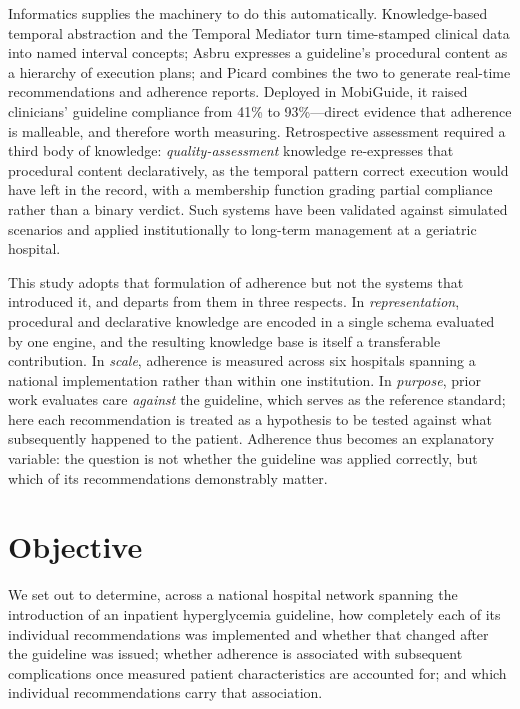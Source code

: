Informatics supplies the machinery to do this automatically. Knowledge-based
temporal abstraction and the Temporal Mediator \citep{shahar1997framework} turn
time-stamped clinical data into named interval concepts; Asbru
\citep{shahar1997asbru, shahar1998asgaard} expresses a guideline's procedural
content as a hierarchy of execution plans; and Picard
\citep{shalom2016architecture} combines the two to generate real-time
recommendations and adherence reports. Deployed in MobiGuide,\citep{peleg2022mobiguide} it raised clinicians' guideline compliance from
41\% to 93\%---direct evidence that adherence is malleable, and therefore worth
measuring. Retrospective assessment required a third body of knowledge:
\emph{quality-assessment} knowledge \citep{ben2024supporting} re-expresses that
procedural content declaratively, as the temporal pattern correct execution
would have left in the record, with a membership function grading partial
compliance rather than a binary verdict. Such systems have been validated
against simulated scenarios \citep{shalom2015multiple} and applied
institutionally to long-term management at a geriatric hospital.\citep{shalom2024implementation}

This study adopts that formulation of adherence but not the systems that
introduced it, and departs from them in three respects. In
\emph{representation}, procedural and declarative knowledge are encoded in a
single schema evaluated by one engine, and the resulting knowledge base is
itself a transferable contribution. In \emph{scale}, adherence is measured
across six hospitals spanning a national implementation rather than within one
institution. In \emph{purpose}, prior work evaluates care \emph{against} the
guideline, which serves as the reference standard; here each recommendation is
treated as a hypothesis to be tested against what subsequently happened to the
patient. Adherence thus becomes an explanatory variable: the question is not
whether the guideline was applied correctly, but which of its recommendations
demonstrably matter.

\section{Objective}
\label{sec:objective}

We set out to determine, across a national hospital network spanning the
introduction of an inpatient hyperglycemia guideline, how completely each of
its individual recommendations was implemented and whether that changed after
the guideline was issued; whether adherence is associated with subsequent
complications once measured patient characteristics are accounted for; and
which individual recommendations carry that association.
